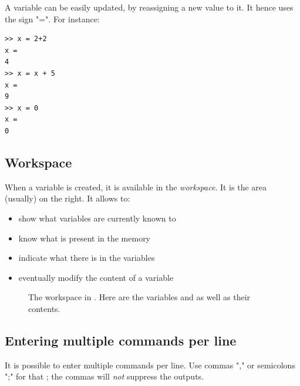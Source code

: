 			A variable can be easily updated, by reassigning a new value to it. It hence uses the sign "=".
			For instance:
\begin{lstlisting}
>> x = 2+2
x = 
4
>> x = x + 5
x =
9
>> x = 0
x =
0
\end{lstlisting}

	\subsection{Workspace}
		When a variable is created, it is available in the \emph{workspace}.
		It is the area (usually) on the right.
		It allows to:
		\begin{itemize}
			\item show what variables are currently known to \matlab
			\item know what is present in the memory
			\item indicate what there is in the variables
			\item eventually modify the content of a variable
		\end{itemize}
		\begin{figure}
			\center
			\caption{
				The workspace in \matlab. Here are the variables  and  as well as their contents.
			}
			\label{fig-workspace}
		\end{figure}	
	\subsection{Entering multiple commands per line}
		It is possible to enter multiple commands per line. 
		Use commas "," or semicolons ";" for that ; the commas will \emph{not} suppress the outputs.

